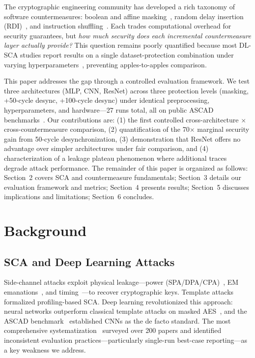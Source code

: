 \documentclass[runningheads]{llncs}
\begin{document}
The cryptographic engineering community has developed a rich taxonomy of software countermeasures: boolean and affine masking~\cite{standardized_DPL_2005,fumaroli2010affine}, random delay insertion (RDI)~\cite{coron2009}, and instruction shuffling~\cite{von2006}. Each trades computational overhead for security guarantees, but \emph{how much security does each incremental countermeasure layer actually provide?} This question remains poorly quantified because most DL-SCA studies report results on a single dataset-protection combination under varying hyperparameters~\cite{picek2023sok}, preventing apples-to-apples comparison.

This paper addresses the gap through a controlled evaluation framework. We test three architectures (MLP, CNN, ResNet) across three protection levels (masking, +50-cycle desync, +100-cycle desync) under identical preprocessing, hyperparameters, and hardware---27 runs total, all on public ASCAD benchmarks~\cite{DBLP:journals/iacr/ProuffSRLB18}. Our contributions are: (1) the first controlled cross-architecture $\times$ cross-countermeasure comparison, (2) quantification of the 70$\times$ marginal security gain from 50-cycle desynchronization, (3) demonstration that ResNet offers no advantage over simpler architectures under fair comparison, and (4) characterization of a leakage plateau phenomenon where additional traces degrade attack performance. The remainder of this paper is organized as follows: Section~2 covers SCA and countermeasure fundamentals; Section~3 details our evaluation framework and metrics; Section~4 presents results; Section~5 discusses implications and limitations; Section~6 concludes.

\section{Background}

\subsection{SCA and Deep Learning Attacks}

Side-channel attacks exploit physical leakage---power (SPA/DPA/CPA)~\cite{kocher1999differential,brier2004correlation}, EM emanations~\cite{agrawal2003em}, and timing~\cite{bernstein2005cache}---to recover cryptographic keys. Template attacks~\cite{chari2002template} formalized profiling-based SCA. Deep learning revolutionized this approach: neural networks outperform classical template attacks on masked AES~\cite{maghrebi2016breaking}, and the ASCAD benchmark~\cite{DBLP:journals/iacr/ProuffSRLB18} established CNNs as the de facto standard. The most comprehensive systematization~\cite{picek2023sok} surveyed over 200 papers and identified inconsistent evaluation practices---particularly single-run best-case reporting---as a key weakness we address.
\end{document}
